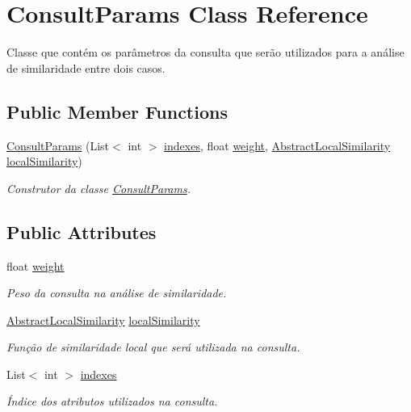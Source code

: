 \hypertarget{class_consult_params}{}\section{Consult\+Params Class Reference}
\label{class_consult_params}


Classe que contém os parâmetros da consulta que serão utilizados para a análise de similaridade entre dois casos.  


\subsection*{Public Member Functions}
\begin{DoxyCompactItemize}
\item 
\hyperlink{class_consult_params_a08afdf573f25bd9af48bde1f43310389}{Consult\+Params} (List$<$ int $>$ \hyperlink{class_consult_params_a48d859e63fc26ee92c05696e73180b9f}{indexes}, float \hyperlink{class_consult_params_aedab07a8d28bff47cbc569778533493e}{weight}, \hyperlink{class_abstract_local_similarity}{Abstract\+Local\+Similarity} \hyperlink{class_consult_params_a1910c45b23c7c0654518ba528d3e5a69}{local\+Similarity})
\begin{DoxyCompactList}\small\item\em Construtor da classe \hyperlink{class_consult_params}{Consult\+Params}. \end{DoxyCompactList}\end{DoxyCompactItemize}
\subsection*{Public Attributes}
\begin{DoxyCompactItemize}
\item 
float \hyperlink{class_consult_params_aedab07a8d28bff47cbc569778533493e}{weight}
\begin{DoxyCompactList}\small\item\em Peso da consulta na análise de similaridade. \end{DoxyCompactList}\item 
\hyperlink{class_abstract_local_similarity}{Abstract\+Local\+Similarity} \hyperlink{class_consult_params_a1910c45b23c7c0654518ba528d3e5a69}{local\+Similarity}
\begin{DoxyCompactList}\small\item\em Função de similaridade local que será utilizada na consulta. \end{DoxyCompactList}\item 
List$<$ int $>$ \hyperlink{class_consult_params_a48d859e63fc26ee92c05696e73180b9f}{indexes}
\begin{DoxyCompactList}\small\item\em Índice dos atributos utilizados na consulta. \end{DoxyCompactList}\end{DoxyCompactItemize}


